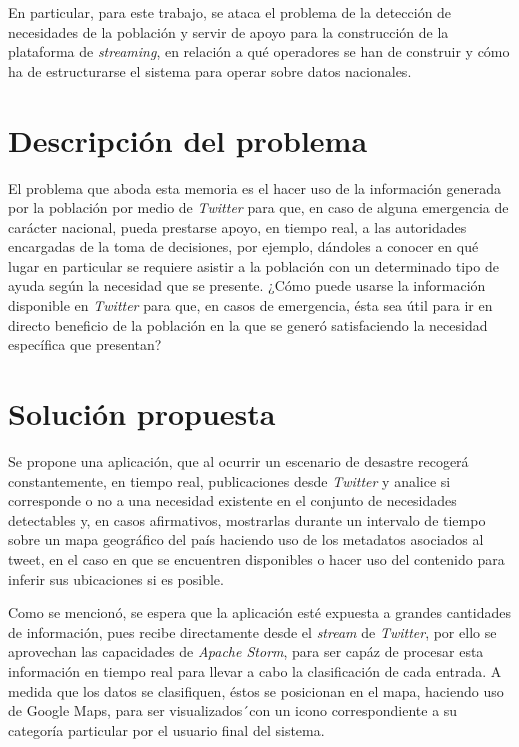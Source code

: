 En particular, para este trabajo, se ataca el problema de la detección de necesidades de la población y servir de apoyo para la construcción de la plataforma de \textit{streaming}, en relación a qué operadores se han de construir y cómo ha de estructurarse el sistema para operar sobre datos nacionales.

\section{Descripción del problema}
\label{intro:problema}

El problema que aboda esta memoria es el hacer uso de la información generada por la población por medio de \textit{Twitter} para que, en caso de alguna emergencia de carácter nacional, pueda prestarse apoyo, en tiempo real, a las autoridades encargadas de la toma de decisiones, por ejemplo, dándoles a conocer en qué lugar en particular se requiere asistir a la población con un determinado tipo de ayuda según la necesidad que se presente. ¿Cómo puede usarse la información disponible en \textit{Twitter} para que, en casos de emergencia, ésta sea útil para ir en directo beneficio de la población en la que se generó satisfaciendo la necesidad específica que presentan?

\section{Solución propuesta}
\label{intro:solucion}

Se propone una aplicación, que al ocurrir un escenario de desastre recogerá constantemente, en tiempo real, publicaciones desde \textit{Twitter} y analice si corresponde o no a una necesidad existente en el conjunto de necesidades detectables y, en casos afirmativos, mostrarlas durante un intervalo de tiempo sobre un mapa geográfico del país haciendo uso de los metadatos asociados al tweet, en el caso en que se encuentren disponibles o hacer uso del contenido para inferir sus ubicaciones si es posible.

Como se mencionó, se espera que la aplicación esté expuesta a grandes cantidades de información, pues recibe directamente desde el \textit{stream} de \textit{Twitter}, por ello se aprovechan las capacidades de \textit{Apache Storm}, para ser capáz de procesar esta información en tiempo real para llevar a cabo la clasificación de cada entrada. A medida que los datos se clasifiquen, éstos se posicionan en el mapa, haciendo uso de Google Maps, para ser visualizados´con un icono correspondiente a su categoría particular por el usuario final del sistema.

